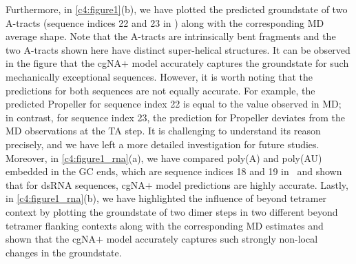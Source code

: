 Furthermore, in \cref{c4:figure1}(b), we have plotted the predicted groundstate of two A-tracts (sequence indices 22 and 23 in \Lbdna) along with the corresponding MD average shape.
Note that the A-tracts are intrinsically bent fragments and the two A-tracts shown here have distinct super-helical structures.
It can be observed in the figure that the cgNA$+$ model accurately captures the groundstate for such mechanically exceptional sequences.
However, it is worth noting that the predictions for both sequences are not equally accurate.
For example, the predicted Propeller for sequence index 22 is equal to the value observed in MD; in contrast, for sequence index 23, the prediction for Propeller deviates from the MD observations at the TA step.
It is challenging to understand its reason precisely, and we have left a more detailed investigation for future studies.
Moreover, in \cref{c4:figure1_rna}(a), we have compared poly(A) and poly(AU) embedded in the GC ends, which are sequence indices 18 and 19 in \Lbrna \ and shown that for dsRNA sequences, cgNA$+$ model predictions are highly accurate.
Lastly, in \cref{c4:figure1_rna}(b), we have highlighted the influence of beyond tetramer context by plotting the groundstate of two dimer steps in two different beyond tetramer flanking contexts along with the corresponding MD estimates and shown that the cgNA$+$ model accurately captures such strongly non-local changes in the groundstate.

